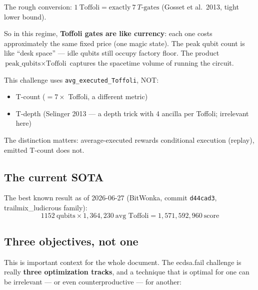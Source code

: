 \documentclass[11pt,a4paper]{article}
\newcommand{\tof}{Toffoli\xspace}
\newcommand{\avgT}{\texttt{avg\_executed\_Toffoli}\xspace}
\begin{document}
The rough conversion: $1\ \text{Toffoli} = \text{exactly}\ 7\ T\text{-gates}$ (Gosset et al.\
2013, tight lower bound).

So in this regime, \textbf{\tof gates are like currency}: each one costs approximately the same
fixed price (one magic state). The peak qubit count is like ``desk space'' --- idle qubits still
occupy factory floor. The product $\text{peak\_qubits} \times \text{Toffoli}$ captures the
spacetime volume of running the circuit.

\begin{tcolorbox}[noteboxstyle, title=Common metric confusion]
This challenge uses \avgT, NOT:
\begin{itemize}
  \item T-count ($= 7 \times$ Toffoli, a different metric)
  \item T-depth (Selinger 2013 --- a depth trick with 4 ancilla per Toffoli; irrelevant here)
\end{itemize}
The distinction matters: average-executed rewards conditional execution (replay), emitted
T-count does not.
\end{tcolorbox}

\subsection{The current SOTA}

The best known result as of 2026-06-27 (BitWonka, commit \texttt{d44cad3},
trailmix\_ludicrous family):
\[
  1152\ \text{qubits} \times 1{,}364{,}230\ \text{avg Toffoli} = 1{,}571{,}592{,}960\ \text{score}
\]

\subsection{Three objectives, not one}
\label{sec:twocomps}

This is important context for the whole document. The ecdsa.fail challenge is really \textbf{three
optimization tracks}, and a technique that is optimal for one can be irrelevant --- or even
counterproductive --- for another:
\end{document}
